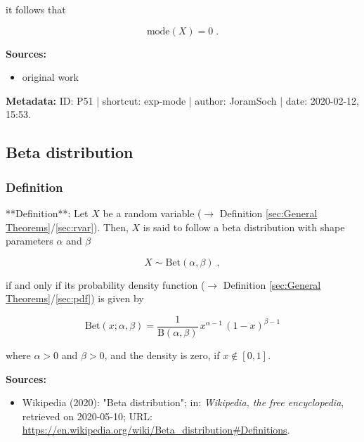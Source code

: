 \documentclass[a4paper,12pt,twoside]{book}
\begin{document}
it follows that

\begin{equation} \label{eq:exp-mode-exp-mode-qed}
\mathrm{mode}(X) = 0 \; .
\end{equation}


\vspace{1em}
\textbf{Sources:}
\begin{itemize}
\item original work\end{itemize}


\vspace{1em}
\textbf{Metadata:} ID: P51 | shortcut: exp-mode | author: JoramSoch | date: 2020-02-12, 15:53.
\vspace{1em}



\subsection{Beta distribution}

\subsubsection[\textit{Definition}]{Definition} \label{sec:beta}
\setcounter{equation}{0}

**Definition**: Let $X$ be a random variable ($\rightarrow$ Definition \ref{sec:General Theorems}/\ref{sec:rvar}). Then, $X$ is said to follow a beta distribution with shape parameters $\alpha$ and $\beta$

\begin{equation} \label{eq:beta-beta}
X \sim \mathrm{Bet}(\alpha, \beta) \; ,
\end{equation}

if and only if its probability density function ($\rightarrow$ Definition \ref{sec:General Theorems}/\ref{sec:pdf}) is given by

\begin{equation} \label{eq:beta-beta-pdf}
\mathrm{Bet}(x; \alpha, \beta) = \frac{1}{\mathrm{B}(\alpha, \beta)} \, x^{\alpha-1} \, (1-x)^{\beta-1}
\end{equation}

where $\alpha > 0$ and $\beta > 0$, and the density is zero, if $x \notin [0,1]$.


\vspace{1em}
\textbf{Sources:}
\begin{itemize}
\item Wikipedia (2020): "Beta distribution"; in: \textit{Wikipedia, the free encyclopedia}, retrieved on 2020-05-10; URL: \url{https://en.wikipedia.org/wiki/Beta_distribution#Definitions}.
\end{itemize}
\end{document}
